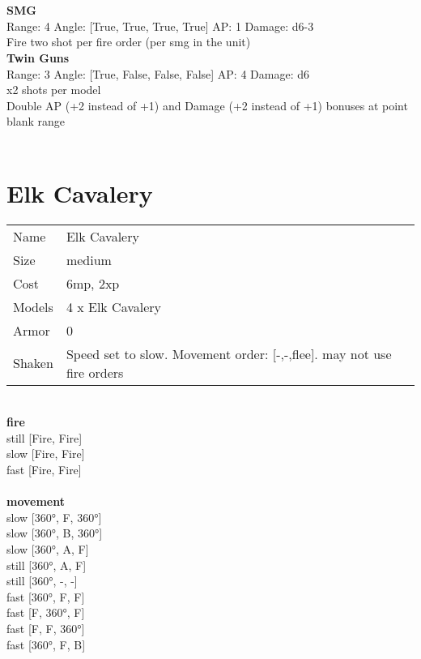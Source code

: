 \ \\

\ \\
{\bf SMG } \\



Range: 4  Angle: [True, True, True, True] AP: 1 Damage: d6-3 \\
Fire two shot per fire order (per smg in the unit)\\ 




{\bf Twin Guns } \\



Range: 3  Angle: [True, False, False, False] AP: 4 Damage: d6 \\
x2 shots per model\\ 
Double AP (+2 instead of +1) and Damage (+2 instead of +1) bonuses at point blank range\\ 




 
\ \\













\clearpage

\section{ Elk Cavalery }

\begin{tabular}{ll}
  Name & Elk Cavalery \\
  Size & medium\\
  Cost & 6mp, 2xp\\
  Models & 4 x Elk Cavalery\\
  Armor & 0\\
  Shaken & Speed set to slow. Movement order: [-,-,flee]. may not use fire orders\\
\end{tabular}

\noindent 

\ \\ {\bf fire } \\
still [Fire, Fire] \\
slow [Fire, Fire] \\
fast [Fire, Fire] \\
\ \\ {\bf movement } \\
slow [360°, F, 360°] \\
slow [360°, B, 360°] \\
slow [360°, A, F] \\
still [360°, A, F] \\
still [360°, -, -] \\
fast [360°, F, F] \\
fast [F, 360°, F] \\
fast [F, F, 360°] \\
fast [360°, F, B] \\


